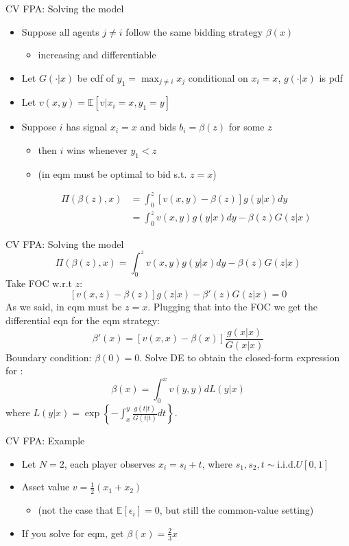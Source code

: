 \documentclass[english,10pt
,aspectratio=169
]{beamer}
\begin{document}
\begin{frame}{CV FPA: Solving the model}
	\begin{itemize}
		\item Suppose all agents $j\neq i$ follow the same bidding strategy $\beta(x)$
		\begin{itemize}
			\item increasing and differentiable
		\end{itemize}
		\item Let $G(\cdot|x)$ be cdf of $y_1 = \max_{j\neq i} x_j$ conditional on $x_i=x$, $g(\cdot|x)$ is pdf
		\item Let $v(x,y) = \mathbb{E} \left[ v | x_i=x, y_1=y \right]$
		\item Suppose $i$ has signal $x_i=x$ and bids $b_i = \beta(z)$ for some $z$
		\begin{itemize}
			\item then $i$ wins whenever $y_1 < z$
			\item (in eqm must be optimal to bid s.t. $z=x$)
		\end{itemize}
		\begin{align*}
			\Pi(\beta(z),x) &= \int_0^z \left[ v(x,y) - \beta(z) \right] g(y|x) dy
			\\
			&= \int_0^z v(x,y) g(y|x) dy - \beta(z) G(z|x)
		\end{align*}
	\end{itemize}
\end{frame}


\begin{frame}{CV FPA: Solving the model}
	\[ \Pi(\beta(z),x) = \int_0^z v(x,y) g(y|x) dy - \beta(z) G(z|x) \]
	Take FOC w.r.t $z$:
	\[ 
		\left[ v(x,z) - \beta(z) \right] g(z|x) - \beta'(z)G(z|x) = 0
	\]
	As we said, in eqm must be $z=x$. Plugging that into the FOC we get the differential eqn for the eqm strategy:
	\[ \beta'(x) = \left[ v(x,x) - \beta(x) \right] \frac{g(x|x)}{G(x|x)} \]
	Boundary condition: $\beta(0)=0$. Solve DE to obtain the closed-form expression for :
	\[ \beta(x) = \int_0^x v(y,y) dL(y|x) \]
	where $L(y|x) = \exp \left\{ -\int_x^y \frac{g(t|t)}{G(t|t)} dt \right\}$.
\end{frame}


\begin{frame}{CV FPA: Example}
	\begin{itemize}
		\item Let $N=2$, each player observes $x_i = s_i + t$, where $s_1,s_2,t \sim \text{i.i.d.}U[0,1]$
		\item Asset value $v = \frac{1}{2} (x_1 + x_2)$
		\begin{itemize}
			\item (not the case that $\mathbb{E}[\epsilon_i]=0$, but still the common-value setting)
		\end{itemize}
		\item If you solve for eqm, get $\beta(x) = \frac{2}{3} x$
	\end{itemize}
\end{frame}
\end{document}
